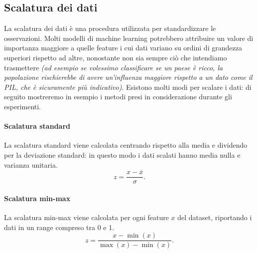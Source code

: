\documentclass[12pt, twoside, letterpaper]{report}
\begin{document}
			\subsection{Scalatura dei dati} La scalatura dei dati è una procedura utilizzata per standardizzare le osservazioni. Molti modelli di machine learning potrebbero attribuire un valore di importanza maggiore a quelle feature i cui dati variano su ordini di grandezza superiori rispetto ad altre, nonostante non sia sempre ciò che intendiamo trasmettere \textit{(ad esempio se volessimo classificare se un paese è ricco, la popolazione rischierebbe di avere un'influenza maggiore rispetto a un dato come il PIL, che è sicuramente più indicativo)}. Esistono molti modi per scalare i dati: di seguito mostreremo in esempio i metodi presi in considerazione durante gli esperimenti.
			
				\paragraph{Scalatura standard} La scalatura standard viene calcolata centrando rispetto alla media e dividendo per la deviazione standard: in questo modo i dati scalati hanno media nulla e varianza unitaria. $$z = \frac{x - \overline{x}}{\sigma}.$$
				
				\paragraph{Scalatura min-max} La scalatura min-max viene calcolata per ogni feature $x$ del dataset, riportando i dati in un range compreso tra 0 e 1. $$z = \frac{x - \min(x)}{\max(x) - \min(x)}.$$
			
\end{document}

